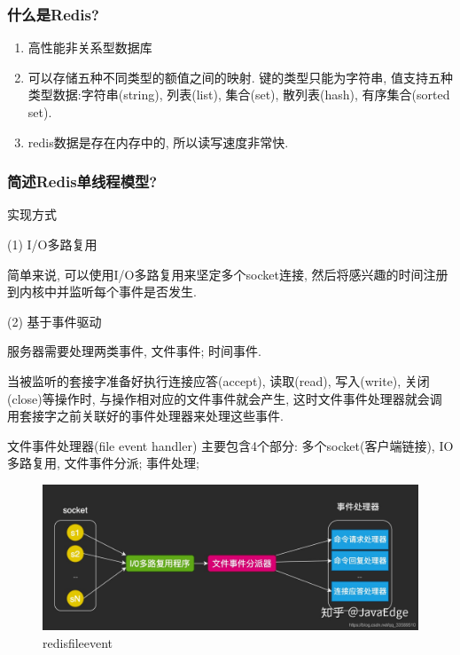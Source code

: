 \documentclass[UTF8]{ctexart}
\begin{document}
\subsubsection{什么是Redis?}
\begin{enumerate}
	\item 高性能非关系型数据库
	\item 可以存储五种不同类型的额值之间的映射. 键的类型只能为字符串, 值支持五种类型数据:字符串(string), 列表(list), 集合(set), 散列表(hash), 有序集合(sorted set).
	\item redis数据是存在内存中的, 所以读写速度非常快.
\end{enumerate}
\subsubsection{简述Redis单线程模型?}
实现方式
\par
(1) I/O多路复用
\par
简单来说, 可以使用I/O多路复用来坚定多个socket连接, 然后将感兴趣的时间注册到内核中并监听每个事件是否发生.
\par
(2) 基于事件驱动
\par
服务器需要处理两类事件, 文件事件; 时间事件.
\par
当被监听的套接字准备好执行连接应答(accept), 读取(read), 写入(write), 关闭(close)等操作时, 与操作相对应的文件事件就会产生, 这时文件事件处理器就会调用套接字之前关联好的事件处理器来处理这些事件.
\par
文件事件处理器(file event handler) 主要包含4个部分: 多个socket(客户端链接), IO多路复用, 文件事件分派; 事件处理;
\begin{figure}
	\centering
	\includegraphics[width=0.7\linewidth]{figures/redis_file_event.jpg}
	\caption{redisfileevent}
	\label{fig:redis_file_event}
\end{figure}
\end{document}
